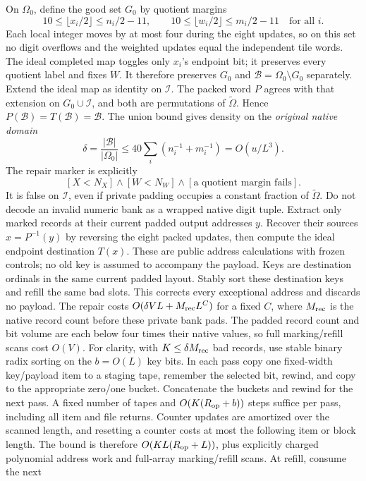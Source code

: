 On $\Omega_0$, define the good set $G_0$ by quotient margins
\[
 10\le\lfloor x_i/2\rfloor\le n_i/2-11,\qquad
 10\le\lfloor w_i/2\rfloor\le m_i/2-11\quad\text{for all }i.
\]
Each local integer moves by at most four during the eight updates, so on
this set no digit overflows and the weighted updates equal the independent
tile words.  The ideal completed map toggles only $x_i$'s endpoint bit;
it preserves every quotient label and fixes $W$.  It therefore preserves
$G_0$ and $\mathcal B=\Omega_0\setminus G_0$ separately.
Extend the ideal map as identity on $\mathcal I$. The packed word
$P$ agrees with that extension on $G_0\cup\mathcal I$, and both
are permutations of $\widetilde\Omega$. Hence
$P(\mathcal B)=T(\mathcal B)=\mathcal B$.
The union bound gives density on the \emph{original native domain}
\[
 \delta=\frac{|\mathcal B|}{|\Omega_0|}
 \le40\sum_i(n_i^{-1}+m_i^{-1})=O(u/L^3).
\]
The repair marker is explicitly
\[
 [X<N_X]\wedge[W<N_W]\wedge[\text{a quotient margin fails}].
\]
It is false on $\mathcal I$, even if private padding occupies a
constant fraction of $\widetilde\Omega$. Do not decode an invalid
numeric bank as a wrapped native digit tuple.
Extract only marked records at their current padded output addresses $y$. Recover
their sources $x=P^{-1}(y)$ by reversing the eight packed updates, then
compute the ideal endpoint destination $T(x)$. These are public address
calculations with frozen controls; no old key is assumed to accompany
the payload. Keys are destination ordinals in the same current padded
layout. Stably sort these destination keys and refill the same bad
slots.  This corrects every exceptional address and discards no payload.
The repair costs $O(\delta VL+M_{\rm rec}L^C)$ for a fixed $C$, where
$M_{\rm rec}$ is the native record count before these private bank
pads. The padded record count and bit volume are each below four
times their native values, so full marking/refill scans cost $O(V)$.
For clarity, with $K\le\delta M_{\rm rec}$ bad records, use stable
binary radix sorting on the $b=O(L)$ key bits. In each pass copy one
fixed-width key/payload item to a staging tape, remember the selected
bit, rewind, and copy to the appropriate zero/one bucket. Concatenate
the buckets and rewind for the next pass. A fixed number of tapes
and $O(K(R_{\rm op}+b))$ steps suffice per pass, including all item
and file returns. Counter updates are amortized over the scanned
length, and resetting a counter costs at most the following item
or block length. The bound is therefore
$O(KL(R_{\rm op}+L))$, plus explicitly charged polynomial address
work and full-array marking/refill scans. At refill, consume the next
